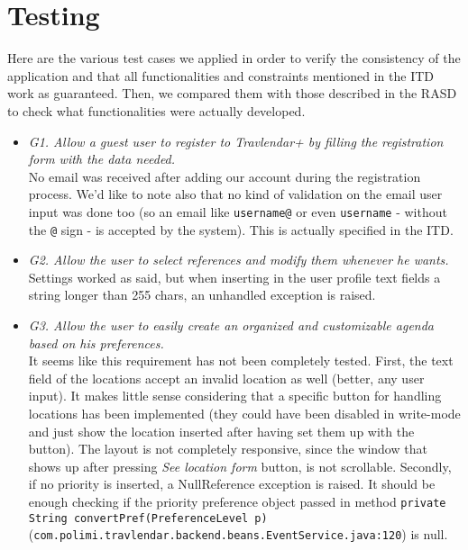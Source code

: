 \chapter{Testing}
\label{cha:testing}

Here are the various test cases we applied in order to verify the consistency of the application and that all functionalities and constraints mentioned in the ITD work as guaranteed. Then, we compared them with those described in the RASD to check what functionalities were actually developed.

\begin{itemize}
\item \textit{G1. Allow a guest user to register to Travlendar+ by filling the registration form with the data needed.} \\
No email was received after adding our account during the registration process. We'd like to note also that no kind of validation on the email user input was done too (so an email like \texttt{username@} or even \texttt{username} - without the \texttt{@} sign - is accepted by the system). This is actually specified in the ITD.

\item \textit{G2. Allow the user to select references and modify them whenever he wants.} \\
Settings worked as said, but when inserting in the user profile text fields a string longer than 255 chars, an unhandled exception is raised.

\item \textit{G3. Allow the user to easily create an organized and customizable agenda based on his preferences.} \\
It seems like this requirement has not been completely tested. First, the text field of the locations accept an invalid location as well (better, any user input). It makes little sense considering that a specific button for handling locations has been implemented (they could have been disabled in write-mode and just show the location inserted after having set them up with the button). The layout is not completely responsive, since the window that shows up after pressing \textit{See location form} button, is not scrollable. Secondly, if no priority is inserted, a NullReference exception is raised. It should be enough checking if the priority preference object passed in method \texttt{private String convertPref(PreferenceLevel p)} (\texttt{com.polimi.travlendar.backend.beans.EventService.java:120}) is null. 


\end{itemize}
